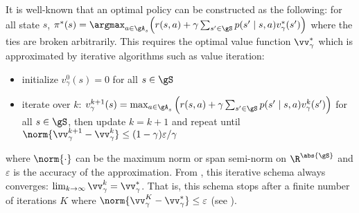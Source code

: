 It is well-known that an optimal policy can be constructed as the following: for all state $s$, $\pi^*(s)=\argmax_{a\in\gA_s}\Big(r(s, a) +\gamma\sum_{s'\in\gS}p(s'\mid s,a)v^*_\gamma(s')\Big)$ where the ties are broken arbitrarily.
This requires the optimal value function $\vv^*_\gamma$ which is approximated by iterative algorithms such as value iteration:
\begin{itemize}
    \item initialize $v_\gamma^0(s)=0$ for all $s\in\gS$
    \item iterate over $k$: $v^{k+1}_\gamma(s) = \max_{a\in\gA_s}\Big(r(s,a)+\gamma\sum_{s'\in\gS}p(s'\mid s,a)v_{\gamma}^k(s')\Big)$ for all $s\in\gS$, then update $k=k+1$ and repeat until $\norm{\vv^{k+1}_\gamma-\vv^k_\gamma}\le(1-\gamma)\varepsilon/\gamma$
\end{itemize}
where $\norm{\cdot}$ can be the maximum norm or span semi-norm on $\R^{\abs{\gS}}$ and $\varepsilon$ is the accuracy of the approximation.
From \cite[Chapter~6]{puterman2014markov}, this iterative schema always converges: $\lim_{k\to\infty}\vv^k_\gamma=\vv^*_\gamma$.
That is, this schema stops after a finite number of iterations $K$ where $\norm{\vv^K_\gamma-\vv^*_\gamma}\le \varepsilon$ (see \cite[Theorem~6.3.1]{puterman2014markov}). 
%

